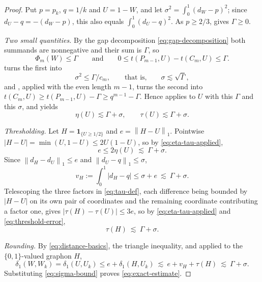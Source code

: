 \documentclass[11pt]{article}
\theoremstyle{remark}
\newcommand{\ind}{\mathbf{1}}
\newcommand{\norm}[1]{\left\lVert #1\right\rVert}
\newcommand{\abs}[1]{\left\lvert #1\right\rvert}
\begin{document}
\begin{proof}
Put $p=p_k$, $q=1/k$ and $U=1-W$, and let
$\sigma^2=\int_0^1(d_W-p)^2$; since $d_U-q=-(d_W-p)$, this also equals
$\int_0^1(d_U-q)^2$. As $p\geq2/3$, \cite[Theorem~1.1]{kim2026goodman} gives
$\Gamma\geq0$.

\emph{Two small quantities.}
By the gap decomposition \eqref{eq:gap-decomposition} both summands are
nonnegative and their sum is $\Gamma$, so
\[
 \Phi_m(W)\leq\Gamma
 \qquad\text{and}\qquad
 0\leq t(P_{m-1},U)-t(C_m,U)\leq\Gamma .
\]
 turns the first into
\begin{equation}\label{eq:sigma-bound}
 \sigma^2\leq\Gamma/c_m,
 \qquad\text{that is,}\qquad \sigma\lesssim\sqrt{\Gamma},
\end{equation}
and , applied with the even length $m-1$, turns the
second into $t(C_m,U)\geq t(P_{m-1},U)-\Gamma\geq q^{m-1}-\Gamma$. Hence
 applies to $U$ with this $\Gamma$ and this $\sigma$,
and yields
\begin{equation}\label{eq:eta-tau-applied}
 \eta(U)\lesssim\Gamma+\sigma,
 \qquad
 \tau(U)\lesssim\Gamma+\sigma .
\end{equation}

\emph{Thresholding.}
Let $H=\ind_{\{U\geq1/2\}}$ and $e=\norm{H-U}_1$. Pointwise
$\abs{H-U}=\min(U,1-U)\leq2U(1-U)$, so by \eqref{eq:eta-tau-applied},
\begin{equation}\label{eq:threshold-error}
 e\leq2\eta(U)\ \lesssim\ \Gamma+\sigma .
\end{equation}
Since $\norm{d_H-d_U}_1\leq e$ and $\norm{d_U-q}_1\leq\sigma$,
\begin{equation}\label{eq:threshold-degrees}
 v_H:=\int_0^1\abs{d_H-q}\leq\sigma+e\ \lesssim\ \Gamma+\sigma .
\end{equation}
Telescoping the three factors in \eqref{eq:tau-def}, each difference
being bounded by $\abs{H-U}$ on its own pair of coordinates and the
remaining coordinate contributing a factor one, gives
$\abs{\tau(H)-\tau(U)}\leq3e$, so by \eqref{eq:eta-tau-applied} and
\eqref{eq:threshold-error},
\begin{equation}\label{eq:threshold-triples}
 \tau(H)\ \lesssim\ \Gamma+\sigma .
\end{equation}

\emph{Rounding.}
By \eqref{eq:distance-basics}, the triangle inequality, and
 applied to the $\{0,1\}$-valued graphon $H$,
\[
 \delta_1(W,W_k)=\delta_1(U,U_k)
 \leq e+\delta_1(H,U_k)
 \ \lesssim\ e+v_H+\tau(H)
 \ \lesssim\ \Gamma+\sigma .
\]
Substituting \eqref{eq:sigma-bound} proves \eqref{eq:exact-estimate}.
\end{proof}
\end{document}
